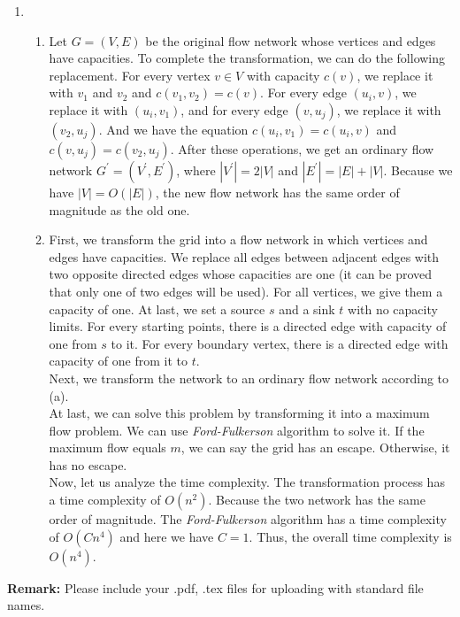 \documentclass[12pt,a4paper]{article}
\makeatletter
\newtheorem*{solution}{Solution}
\theoremstyle{definition}
\renewenvironment{solution}[1][Solution] {\par\pushQED{\qed}\normalfont\topsep6\p@\@plus6\p@\relax\trivlist\item[\hskip\labelsep\bfseries#1\@addpunct{.}]\ignorespaces}{\popQED\endtrivlist\@endpefalse} \makeatother
\makeatother
\begin{document}
\begin{enumerate}
    \begin{solution}
    ~
    \begin{enumerate}
        \item 
        Let $G=(V,E)$ be the original flow network whose vertices and edges have capacities. To complete the transformation, we can do the following replacement. For every vertex $v\in V$ with capacity $c(v)$, we replace it with $v_1$ and $v_2$ and $c(v_1,v_2) = c(v)$. For every edge $(u_i,v)$, we replace it with $(u_i,v_1)$, and for every edge $(v,u_j)$, we replace it with $(v_2,u_j)$. And we have the equation $c(u_i,v_1)=c(u_i,v)$ and $c(v,u_j)=c(v_2,u_j)$. After these operations, we get an ordinary flow network $G^{'}=(V^{'},E^{'})$, where $|V^{'}| = 2|V|$ and $|E^{'}|=|E|+|V|$. Because we have $|V|=O(|E|)$, the new flow network has the same order of magnitude as the old one.
        \item
        First, we transform the grid into a flow network in which vertices and edges have capacities. We replace all edges between adjacent edges with two opposite directed edges whose capacities are one (it can be proved that only one of two edges will be used). For all vertices, we give them a capacity of one. At last, we set a source $s$ and a sink $t$ with no capacity limits. For every starting points, there is a directed edge with capacity of one from $s$ to it. For every boundary vertex, there is a directed edge with capacity of one from it to $t$.\\
        Next, we transform the network to an ordinary flow network according to (a).\\
        At last, we can solve this problem by transforming it into a maximum flow problem. We can use \emph{Ford-Fulkerson} algorithm to solve it. If the maximum flow equals $m$, we can say the grid has an escape. Otherwise, it has no escape.\\
        Now, let us analyze the time complexity. The transformation process has a time complexity of $O(n^2)$. Because the two network has the same order of magnitude. The \emph{Ford-Fulkerson} algorithm has a time complexity of $O(C n^4)$ and here we have $C=1$. Thus, the overall time complexity is $O(n^4)$.
    \end{enumerate}
    \end{solution}
\end{enumerate}

\textbf{Remark:} Please include your .pdf, .tex files for uploading with standard file names.
\newpage


\end{document}
